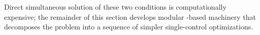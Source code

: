 \documentclass[titlepage, headings=optiontotocandhead]{econark}
\begin{document}
Direct simultaneous solution of these two conditions is computationally expensive; the remainder of this section develops modular {\stg}-based machinery that decomposes the problem into a sequence of simpler single-control optimizations.

\end{document}

